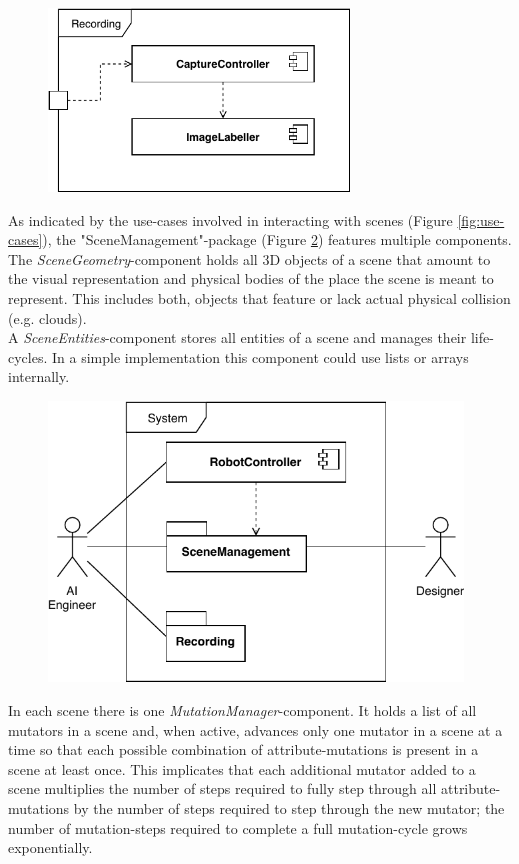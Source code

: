 \begin{figure}
    \centering
    \includegraphics[width=8cm]{img/ch04/ComponentDiagram_Recording.pdf}
    \label{fig:component-diagram-recording}
\end{figure}
As indicated by the use-cases involved in interacting with scenes (Figure \ref{fig:use-cases}), the "SceneManagement"-package (Figure \ref{fig:component-diagram-scenemanagement}) features multiple components.\\
The \emph{SceneGeometry}-component holds all 3D objects of a scene that amount to the visual representation and physical bodies of the place the scene is meant to represent. This includes both, objects that feature or lack actual physical collision (e.g. clouds).\\
A \emph{SceneEntities}-component stores all entities of a scene and manages their life-cycles. In a simple implementation this component could use lists or arrays internally.
\begin{figure}[hb!]
    \centering
    \includegraphics[width=11cm]{img/ch04/ComponentDiagram_SceneManagement02.pdf}
    \label{fig:component-diagram-scenemanagement}
\end{figure}
In each scene there is one \emph{MutationManager}-component. It holds a list of all mutators in a scene and, when active, advances only one mutator in a scene at a time so that each possible combination of attribute-mutations is present in a scene at least once. This implicates that each additional mutator added to a scene multiplies the number of steps required to fully step through all attribute-mutations by the number of steps required to step through the new mutator; the number of mutation-steps required to complete a full mutation-cycle grows exponentially.\\
